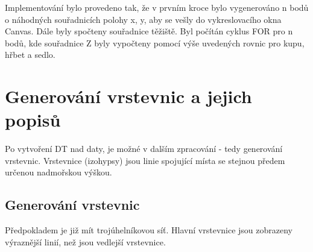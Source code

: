 \documentclass[oneside,12pt,a4paper]{book}
\begin{document}




Implementování bylo provedeno tak, že v prvním kroce bylo vygenerováno n bodů o náhodných souřadnicích polohy x, y, aby se vešly do vykreslovacího okna Canvas. Dále byly spočteny souřadnice těžiště. Byl počítán cyklus FOR pro n bodů, kde souřadnice Z byly vypočteny pomocí výše uvedených rovnic pro kupu, hřbet a sedlo.\par

\section{Generování vrstevnic a jejich popisů}
Po vytvoření DT nad daty, je možné v dalším zpracování - tedy generování vrstevnic. Vrstevnice (izohypsy) jsou linie spojující místa se stejnou předem určenou nadmořskou výškou.\par

\subsection{Generování vrstevnic}
Předpokladem je již mít trojúhelníkovou síť. Hlavní vrstevnice jsou zobrazeny výraznější linií, než jsou vedlejší vrstevnice.
\end{document}
